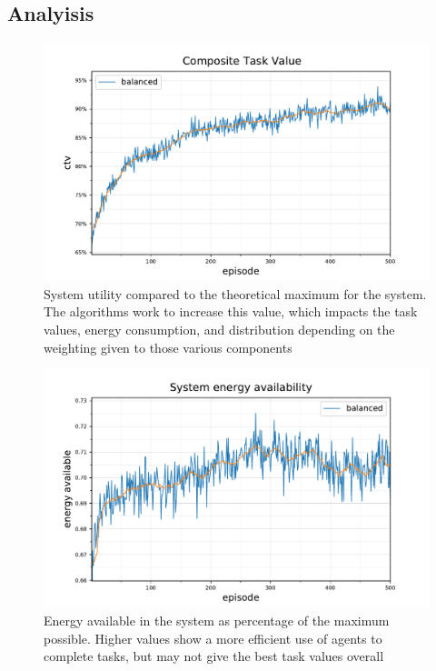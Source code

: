 \subsection{Analyisis}


\begin{figure}[ht]
	\centering
	\includegraphics[width=0.7\linewidth]{5_ctv-optimal-ctv}
	\captionsetup{labelfont=bf,singlelinecheck=on}
	\caption{System utility compared to the theoretical maximum for the \simulationSimple{}{} system. The algorithms work to increase this value, which impacts the task values, energy consumption, and distribution depending on the weighting given to those various components}
	\label{fig:5_ctv-optimal-ctv}
\end{figure}
\begin{figure}[ht]
	\centering
	\includegraphics[width=0.7\linewidth]{5_ctv-statistics-energy-available}
	\captionsetup{labelfont=bf,singlelinecheck=on}
	\caption{Energy available in the \simulationSimple{}{} system as percentage of the maximum possible. Higher values show a more efficient use of agents to complete tasks, but may not give the best task values overall}
	\label{fig:5_ctv-statistics-energy-available}
\end{figure}

